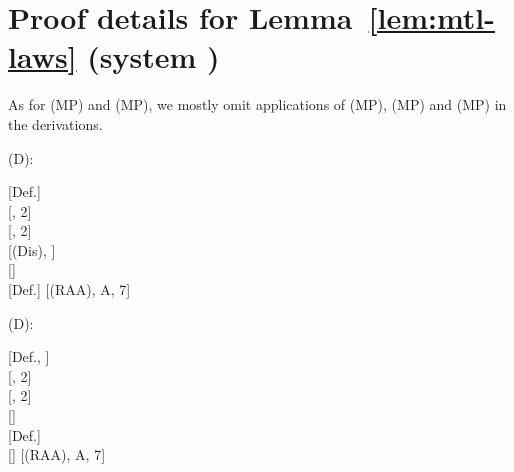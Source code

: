 \documentclass[a4paper,english,fleqn,11pt,final]{scrartcl}
\newcommand{\negg}{{\sim}}
\newcommand{\Deriv}[1]{{\normalfont\textsf{#1}}}
\newcommand{\oland}{\owedge}
\theoremstyle{plain}
\theoremstyle{definition}
\begin{document}
\section{Proof details for Lemma~\ref{lem:mtl-laws} (system )}

\label{sec:aux-modal}

As for \Deriv{(MP)} and \Deriv{(MP)}, we mostly omit applications of \Deriv(MP), \Deriv(MP) and \Deriv(MP) in the derivations.

\bigskip

{
\scriptsize




\begin{minipage}[t][][b]{.43\textwidth}

\Deriv{(D)}:

\medskip

{
\setlength{\fitchprfwidth}{1.33in}
\fitchprf{
\pline[A ]{\Diamond(\varphi\ovee\psi)}
}
{
\subproof{\pline[1 ]{\negg\Diamond\varphi \ovee \Diamond\psi)}}
{
	\pline[2 ]{\negg(\negg\triangle\negg\varphi \ovee \negg\triangle\negg\psi)\hspace{-9pt}}[Def.]\\
	\pline[3 ]{\triangle\negg\varphi}[, 2]\\
	\pline[4 ]{\triangle\negg\psi}[, 2]\\
	\pline[5 ]{\triangle\negg(\varphi \ovee \psi)}[\Deriv{(Dis)}, ]\\
	\pline[6 ]{\negg\negg\triangle\negg(\varphi \ovee \psi)}[]\\
	\pline[7 ]{\negg\Diamond(\varphi \ovee \psi)}[Def.]
}
	\pline[\slider]{\Diamond\varphi \ovee \Diamond\psi}[\Deriv{(RAA)}, A, 7]
}
}
\end{minipage}
\begin{minipage}[t][][b]{.46\textwidth}

\Deriv{(D)}:

\medskip

{
\setlength{\fitchprfwidth}{1.58in}
\fitchprf{
\pline[A ]{\Diamond\varphi \ovee \Diamond\psi}
}
{
\subproof{\pline[1 ]{\negg\Diamond(\varphi \ovee\psi)}}
{
	\pline[2 ]{\triangle\negg(\varphi \ovee \psi)}[Def., ]\\
	\pline[3 ]{\triangle\negg\varphi}[, 2]\\
	\pline[4 ]{\triangle\negg\psi}[, 2]\\
	\pline[5 ]{(\negg\negg\triangle\negg\varphi) \oland (\negg\negg\triangle\negg\psi)}[]\\
	\pline[6 ]{(\negg \Diamond\varphi) \oland (\negg\Diamond\psi)}[Def.]\\
	\pline[7 ]{\negg(\Diamond \varphi \ovee \Diamond \psi)}[]
}
	\pline[\slider]{\Diamond(\varphi \ovee\psi)}[\Deriv{(RAA)}, A, 7]
}
}
\end{minipage}




}
\end{document}
